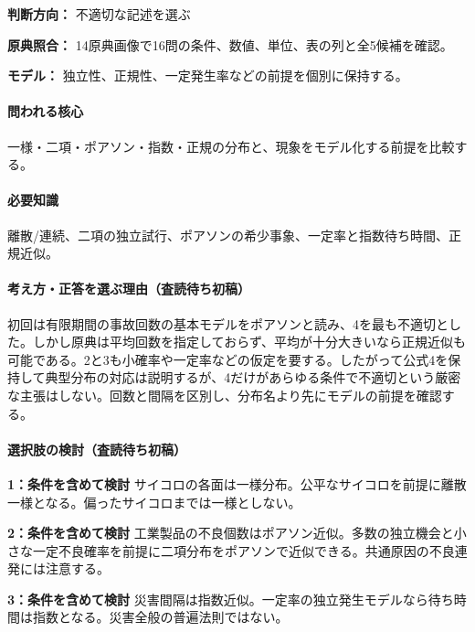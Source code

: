 \noindent\textbf{判断方向：} 不適切な記述を選ぶ\par

\noindent\textbf{原典照合：} 14原典画像で16問の条件、数値、単位、表の列と全5候補を確認。\par

\noindent\textbf{モデル：} 独立性、正規性、一定発生率などの前提を個別に保持する。\par

\paragraph{問われる核心} 一様・二項・ポアソン・指数・正規の分布と、現象をモデル化する前提を比較する。

\paragraph{必要知識} 離散/連続、二項の独立試行、ポアソンの希少事象、一定率と指数待ち時間、正規近似。

\paragraph{考え方・正答を選ぶ理由（査読待ち初稿）} 初回は有限期間の事故回数の基本モデルをポアソンと読み、4を最も不適切とした。しかし原典は平均回数を指定しておらず、平均が十分大きいなら正規近似も可能である。2と3も小確率や一定率などの仮定を要する。したがって公式4を保持して典型分布の対応は説明するが、4だけがあらゆる条件で不適切という厳密な主張はしない。回数と間隔を区別し、分布名より先にモデルの前提を確認する。

\paragraph{選択肢の検討（査読待ち初稿）}\mbox{}\par

\noindent\textbf{1：条件を含めて検討} サイコロの各面は一様分布。公平なサイコロを前提に離散一様となる。偏ったサイコロまでは一様としない。\par

\noindent\textbf{2：条件を含めて検討} 工業製品の不良個数はポアソン近似。多数の独立機会と小さな一定不良確率を前提に二項分布をポアソンで近似できる。共通原因の不良連発には注意する。\par

\noindent\textbf{3：条件を含めて検討} 災害間隔は指数近似。一定率の独立発生モデルなら待ち時間は指数となる。災害全般の普遍法則ではない。\par

